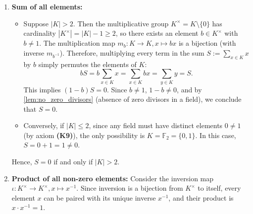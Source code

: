\begin{exercisesolution}
\label{sol:finite_field_sum_product}
\begin{enumerate}[label=\textbf{(\alph*)}]
    \item \textbf{Sum of all elements:}
    \begin{itemize}
        \item Suppose $|K| > 2$. Then the multiplicative group $K^\times = K \setminus \{0\}$ has cardinality $|K^\times| = |K| - 1 \ge 2$, so there exists an element $b \in K^\times$ with $b \ne 1$.
        The multiplication map $m_b \colon K \to K, x \mapsto bx$ is a bijection (with inverse $m_{b^{-1}}$). Therefore, multiplying every term in the sum $S := \sum_{x \in K} x$ by $b$ simply permutes the elements of $K$:
        \[
        bS = b \sum_{x \in K} x = \sum_{x \in K} bx = \sum_{y \in K} y = S.
        \]
        This implies $(1 - b)S = 0$. Since $b \ne 1$, $1 - b \ne 0$, and by \cref{lem:no_zero_divisors} (absence of zero divisors in a field), we conclude that $S = 0$.
        \item Conversely, if $|K| \le 2$, since any field must have distinct elements $0 \ne 1$ (by axiom \textbf{(K9)}), the only possibility is $K = \mathbb{F}_2 = \{0, 1\}$. In this case, $S = 0 + 1 = 1 \ne 0$.
    \end{itemize}
    Hence, $S = 0$ if and only if $|K| > 2$.

    \item \textbf{Product of all non-zero elements:} Consider the inversion map $\iota \colon K^\times \to K^\times, x \mapsto x^{-1}$. Since inversion is a bijection from $K^\times$ to itself, every element $x$ can be paired with its unique inverse $x^{-1}$, and their product is $x \cdot x^{-1} = 1$.
    

\end{enumerate}
\end{exercisesolution}
